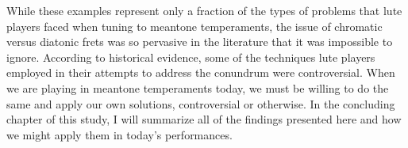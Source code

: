 While these examples represent only a fraction of the types of problems that lute players faced when tuning to meantone
temperaments, the issue of chromatic versus diatonic frets was so pervasive in the literature that it was impossible to
ignore. According to historical evidence, some of the techniques lute players employed in their attempts to address the
conundrum were controversial. When we are playing in meantone temperaments today, we must be willing to do the same and
apply our own solutions, controversial or otherwise. In the concluding chapter of this study, I will summarize all of
the findings presented here and how we might apply them in today's performances.
